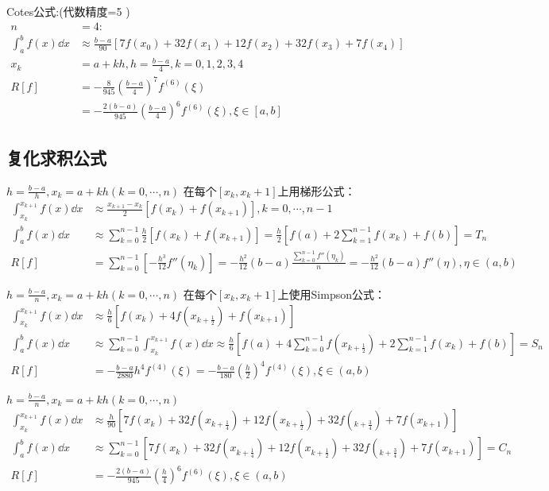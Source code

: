 Cotes公式:(代数精度=5 )
\begin{align*}
    n&=4:\\
    \int_{a}^{b}f(x)\dd{x}&\approx \frac{b-a}{90}[7f(x_0)+32f(x_1)+12f(x_2)+32f(x_3)+7f(x_4)]\\
    x_k &= a+kh,h = \frac{b-a}{4},k = 0,1,2,3,4\\
    R[f] &= -\frac{8}{945}(\frac{b-a}{4})^7f^{(6)}(\xi ) \\
    &= -\frac{2(b-a)}{945}(\frac{b-a}{4})^6f^{(6)}(\xi ),\xi \in [a,b]
\end{align*}

\subsection{复化求积公式}

\begin{definition}[复化梯形公式]
    $h = \frac{b-a}{h},x_k=a+kh(k=0,\cdots,n)$
    在每个$[x_k,x_k+1]$上用梯形公式：
    \begin{align*}
        \int_{x_k}^{x_{k+1}}f(x)\dd{x}&\approx \frac{x_{k+1}-x_k}{2}[f(x_k)+f(x_{k+1})],k=0,\cdots,n-1\\
        \int_{a}^{b}f(x)\dd{x}&\approx \sum_{k=0}^{n-1}\frac{h}{2}[f(x_k)+f(x_{k+1})] = \frac{h}{2}[f(a)+2\sum_{k=1}^{n-1}f(x_k)+f(b)] = T_n\\
        R[f] &= \sum_{k=0}^{n-1}[-\frac{h^3}{12}f''(\eta_k)] = -\frac{h^2}{12}(b-a)\frac{\sum_{k=0}^{n-1}f''(\eta_k)}{n} = -\frac{h^2}{12}(b-a)f''(\eta),\eta \in (a,b)
    \end{align*}
\end{definition}

\begin{definition}[复化Simpson公式]
    $h = \frac{b-a}{n},x_k = a+kh(k=0,\cdots,n)$
    在每个$[x_k,x_k+1]$上使用Simpson公式：
    \begin{align*}
        \int_{x_k}^{x_{k+1}}f(x)\dd{x}&\approx \frac{h}{6}[f(x_k)+4f(x_{k+\frac{1}{2}})+f(x_{k+1})]\\
        \int_{a}^{b}f(x)\dd{x}&\approx \sum_{k=0}^{n-1}\int_{x_k}^{x_{k+1}}f(x)\dd{x} \approx \frac{h}{6}[f(a)+4\sum_{k=0}^{n-1}f(x_{k+\frac{1}{2}})+2\sum_{k=1}^{n-1}f(x_k)+f(b)] = S_n\\
        R[f] &= -\frac{b-a}{2880}h^4f^{(4)}(\xi ) = -\frac{b-a}{180}(\frac{h}{2})^4f^{(4)}(\xi ),\xi \in (a,b)
    \end{align*}
\end{definition}

\begin{definition}[复化Cotes公式]
    $h = \frac{b-a}{n},x_k = a+kh(k=0,\cdots,n)$
    \begin{align*}
        \int_{x_k}^{x_{k+1}}f(x)\dd{x}&\approx \frac{h}{90}[7f(x_k)+32f(x_{k+\frac{1}{4}})+12f(x_{k+\frac{1}{2}})+32f(_{k+\frac{3}{4}})+7f(x_{k+1})]\\
        \int_{a}^{b}f(x)\dd{x}&\approx \sum_{k=0}^{n-1}[7f(x_k)+32f(x_{k+\frac{1}{4}})+12f(x_{k+\frac{1}{2}})+32f(_{k+\frac{3}{4}})+7f(x_{k+1})] = C_n\\
        R[f] &= -\frac{2(b-a)}{945}(\frac{h}{4})^6f^{(6)}(\xi ),\xi \in (a,b)
    \end{align*}
\end{definition}

